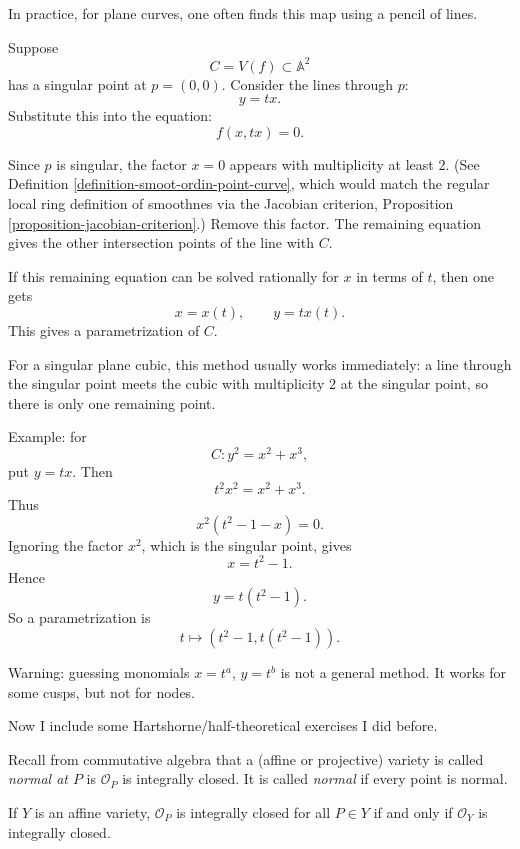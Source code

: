 In practice, for plane curves, one often
finds this map using a pencil of lines.

Suppose
$$
  C=V(f)\subset \mathbb A^2
$$
has a singular point at $p=(0,0)$.
Consider the lines through $p$:
$$
  y=tx.
$$
Substitute this into the equation:
$$
  f(x,tx)=0.
$$

Since $p$ is singular, the factor $x=0$
appears with multiplicity at least $2$.
(See Definition
\ref{definition-smoot-ordin-point-curve},
which would match the regular local ring
definition of smoothnes via
the Jacobian criterion,
Proposition
\ref{proposition-jacobian-criterion}.)
Remove this factor. The remaining
equation gives the other intersection
points of the line with $C$.

If this remaining equation can be solved
rationally for $x$ in terms of $t$, then
one gets
$$
  x=x(t),
  \qquad
  y=tx(t).
$$
This gives a parametrization of $C$.

For a singular plane cubic, this method
usually works immediately: a line through
the singular point meets the cubic with
multiplicity $2$ at the singular point,
so there is only one remaining point.

Example: for
$$
  C: y^2=x^2+x^3,
$$
put $y=tx$. Then
$$
  t^2x^2=x^2+x^3.
$$
Thus
$$
  x^2(t^2-1-x)=0.
$$
Ignoring the factor $x^2$, which is the
singular point, gives
$$
  x=t^2-1.
$$
Hence
$$
  y=t(t^2-1).
$$
So a parametrization is
$$
  t\mapsto (t^2-1,t(t^2-1)).
$$

Warning: guessing monomials
$x=t^a$, $y=t^b$ is not a general
method. It works for some cusps, but not
for nodes.

\medskip\noindent
Now I include some
Hartshorne/half-theoretical
exercises I did before.

Recall from commutative algebra
that a (affine or projective) 
variety is called {\it normal at $P$}
is $\mathcal{O}_P$ is integrally closed.
It is called {\it normal} if every point
is normal.

\begin{exercise}
\label{exercise-normal-varieties}
If $Y$ is an affine variety,
$\mathcal{O}_P$ is integrally closed
for all $P \in Y$ if and only if
$\mathcal{O}_Y$ is integrally closed.
\end{exercise}

